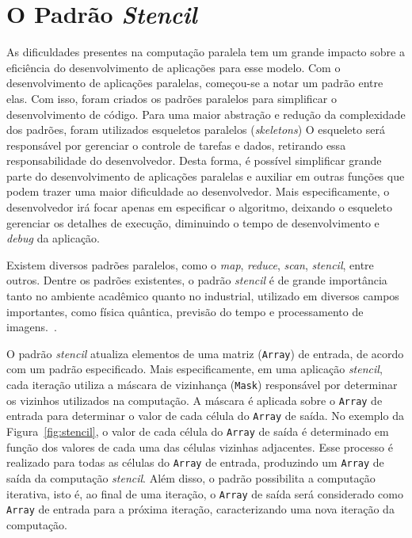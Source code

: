 \section{O Padrão \textit{Stencil}}

As dificuldades presentes na computação paralela tem um grande impacto sobre a
eficiência do desenvolvimento de aplicações para esse modelo. Com o
desenvolvimento de aplicações paralelas, começou-se a notar um padrão entre
elas. Com isso, foram criados os padrões paralelos para simplificar o
desenvolvimento de código.
Para uma maior abstração e redução da complexidade dos padrões, foram utilizados
esqueletos paralelos (\textit{skeletons}) O esqueleto será responsável por
gerenciar o controle de tarefas e dados, retirando essa responsabilidade do
desenvolvedor. Desta forma, é possível simplificar grande parte do
desenvolvimento de aplicações paralelas e auxiliar em outras funções que podem
trazer uma maior dificuldade ao desenvolvedor. Mais especificamente, o
desenvolvedor irá focar apenas em especificar o algoritmo, deixando o esqueleto
gerenciar os detalhes de execução, diminuindo o tempo de desenvolvimento e
\textit{debug} da aplicação.

Existem diversos padrões paralelos, como o \textit{map}, \textit{reduce},
\textit{scan}, \textit{stencil}, entre outros. Dentre os padrões existentes, o
padrão \textit{stencil} é de grande importância tanto no ambiente acadêmico quanto no
industrial, utilizado em diversos campos importantes, como física quântica,
previsão do tempo e processamento de imagens.~\cite{pereira15}.

O padrão \textit{stencil} atualiza elementos de uma matriz (\texttt{Array}) de entrada,
de acordo com um padrão especificado. Mais especificamente, em uma aplicação
\textit{stencil}, cada iteração utiliza a máscara de vizinhança (\texttt{Mask})
responsável por determinar os vizinhos utilizados na computação. A máscara é
aplicada sobre o \texttt{Array} de entrada para determinar o valor de cada
célula do \texttt{Array} de saída. No exemplo da Figura~\ref{fig:stencil}, o
valor de cada célula do \texttt{Array} de saída é determinado em função dos
valores de cada uma das células vizinhas adjacentes. Esse processo é realizado
para todas as células do \texttt{Array} de entrada, produzindo um \texttt{Array}
de saída da computação \textit{stencil}. Além disso, o padrão possibilita a computação
iterativa, isto é, ao final de uma iteração, o \texttt{Array} de saída será
considerado como \texttt{Array} de entrada para a próxima iteração,
caracterizando uma nova iteração da computação.

